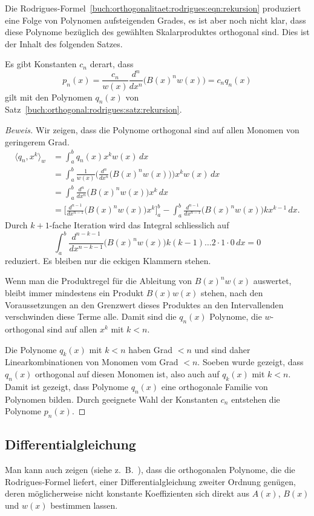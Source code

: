Die Rodrigues-Formel~\eqref{buch:orthogonalitaet:rodrigues:eqn:rekursion}
produziert eine Folge von Polynomen aufsteigenden Grades, es ist aber
noch nicht klar, dass diese Polynome bezüglich des gewählten Skalarproduktes
orthogonal sind.
Dies ist der Inhalt des folgenden Satzes.

\begin{satz}
%
Es gibt Konstanten $c_n$ derart, dass
\[
p_n(x)
=
\frac{c_n}{w(x)} \frac{d^n}{dx^n} \bigl(B(x)^n w(x)\bigr) 
=
c_n q_n(x)
\]
gilt mit den Polynomen $q_n(x)$ von
Satz~\ref{buch:orthogonal:rodrigues:satz:rekursion}.
\end{satz}

\begin{proof}[Beweis]
Wir zeigen, dass die Polynome orthogonal sind auf allen Monomen
von geringerem Grad.
\begin{align*}
\langle q_n, x^k\rangle_w
&=
\int_a^b q_n(x)x^kw(x)\,dx
\\
&=
\int_a^b \frac{1}{w(x)}
\biggl(\frac{d^n}{dx^n}\bigl(B(x)^n w(x)\bigr)\biggr)
x^k w(x)\,dx
\\
&=
\int_a^b \frac{d^n}{dx^n}\bigl(B(x)^n w(x)\bigr) x^k \,dx
\\
&=
\biggl[\frac{d^{n-1}}{dx^{n-1}}\bigl(B(x)^n w(x)\bigr) x^k \biggr]_a^b
-
\int_a^b \frac{d^{n-1}}{dx^{n-1}}\bigl(B(x)^n w(x)\bigr)kx^{k-1}\,dx.
\end{align*}
Durch $k+1$-fache Iteration wird das Integral schliesslich auf
\[
\int_a^b
\frac{d^{n-k-1}}{dx^{n-k-1}}
\bigl(B(x)^nw(x)\bigr)
k(k-1)\dots2\cdot1\cdot 0\,dx
=
0
\]
reduziert.
Es bleiben nur die eckigen Klammern stehen.

Wenn man die Produktregel für die Ableitung
von $B(x)^nw(x)$ auswertet, bleibt immer mindestens ein Produkt
$B(x)w(x)$ stehen,
nach den Voraussetzungen an den Grenzwert dieses Produktes an den
Intervallenden verschwinden diese Terme alle.
Damit sind die $q_n(x)$ Polynome, die $w$-orthogonal sind auf allen
$x^k$ mit $k<n$.

Die Polynome $q_k(x)$ mit $k< n$ haben Grad $<n$ und sind daher
Linearkombinationen von Monomen vom Grad $<n$.
Soeben wurde gezeigt, dass $q_n(x)$ orthogonal auf diesen Monomen
ist, also auch auf $q_k(x)$ mit $k<n$.
Damit ist gezeigt, dass Polynome $q_n(x)$ eine orthogonale Familie
von Polynomen bilden.
Durch geeignete Wahl der Konstanten $c_n$ entstehen die Polynome $p_n(x)$.
\end{proof}

\subsection{Differentialgleichung}
Man kann auch zeigen (siehe z.~B.~\cite{buch:pearsondgl}),
dass die orthogonalen Polynome, die die
Rodrigues-Formel liefert, einer Differentialgleichung zweiter 
Ordnung genügen, deren möglicherweise nicht konstante Koeffizienten
sich direkt aus $A(x)$, $B(x)$ und $w(x)$ bestimmen lassen.

